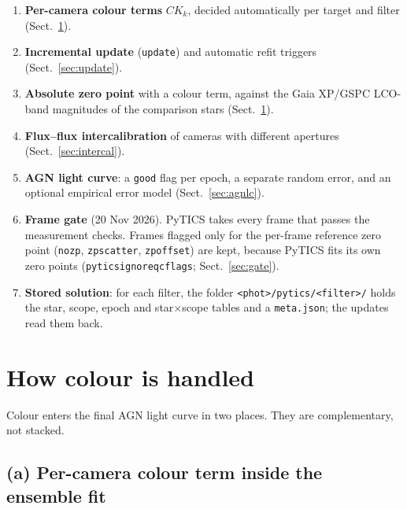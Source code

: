 \documentclass[10pt,a4paper,oneside]{report}
\renewcommand{\_}{\oldunderscore\allowbreak}
\begin{document}
\begin{enumerate}
        gauge-free quantities are those that do not change under such shifts: the total
        per-epoch correction $\Delta T_t + \Delta S_{k(t)}$ and the star means, each with its median
        change removed, and the colour terms. A whole scope's $\Delta T$ can trade with its $\Delta S$
        without changing any prediction, which keeps the published test alive. Which rule fired is
        stored in \texttt{meta.stop}; on Mrk\,817 every filter stops on this rule.
  \item \textbf{Per-camera colour terms} $CK_k$, decided automatically per target and filter
        (Sect.~\ref{sec:colour}).
  \item \textbf{Incremental update} (\texttt{update}) and automatic refit triggers
        (Sect.~\ref{sec:update}).
  \item \textbf{Absolute zero point} with a colour term, against the Gaia XP/GSPC LCO-band magnitudes
        of the comparison stars (Sect.~\ref{sec:colour}).
  \item \textbf{Flux--flux intercalibration} of cameras with different apertures (Sect.~\ref{sec:intercal}).
  \item \textbf{AGN light curve}: a \texttt{good} flag per epoch, a separate random error, and an
        optional empirical error model (Sect.~\ref{sec:agnlc}).
  \item \textbf{Frame gate} (20 Nov 2026). PyTICS takes every frame that passes the measurement checks.
        Frames flagged only for the per-frame reference zero point (\texttt{no\_zp}, \texttt{zp\_scatter},
        \texttt{zp\_offset}) are kept, because PyTICS fits its own zero points
        (\texttt{pytics\_ignore\_qc\_flags}; Sect.~\ref{sec:gate}).
  \item \textbf{Stored solution}: for each filter, the folder \texttt{<phot>/pytics/<filter>/} holds
        the star, scope, epoch and star$\times$scope tables and a \texttt{meta.json}; the updates read
        them back.
\end{enumerate}

\section{How colour is handled}
\label{sec:colour}

Colour enters the final AGN light curve in two places. They are complementary, not stacked.

\subsection{(a) Per-camera colour term inside the ensemble fit}
\end{document}
